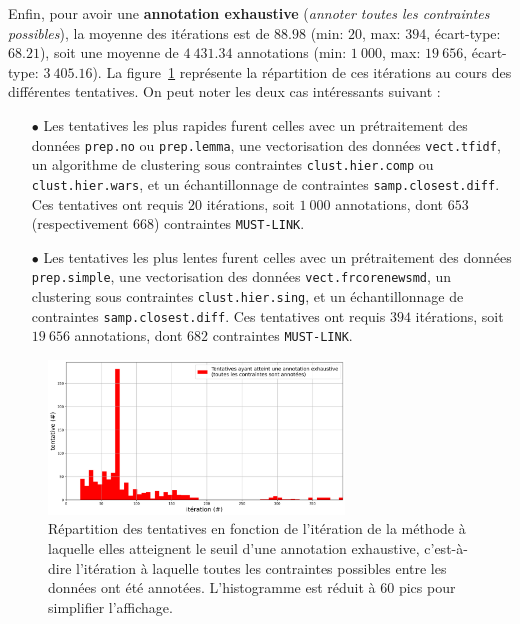 			Enfin, pour avoir une \textbf{annotation exhaustive} (\textit{annoter toutes les contraintes possibles}), la moyenne des itérations est de $88.98$ (min: $20$, max: $394$, écart-type: $68.21$), soit une moyenne de $4~431.34$ annotations (min: $1~000$, max: $19~656$, écart-type: $3~405.16$).
			La figure~\ref{figure:4.2.1-ETUDE-OPTIMISATION-HISTOGRAMME-ANNOTATION-EXHAUSTIVE} représente la répartition de ces itérations au cours des différentes tentatives.
			On peut noter les deux cas intéressants suivant :
			\begin{itemize}
				\item[$\bullet$] Les tentatives les plus rapides furent celles avec un prétraitement des données \texttt{prep.no} ou \texttt{prep.lemma}, une vectorisation des données \texttt{vect.tfidf}, un algorithme de clustering sous contraintes \texttt{clust.hier.comp} ou \texttt{clust.hier.wars}, et un échantillonnage de contraintes \texttt{samp.closest.diff}. Ces tentatives ont requis $20$ itérations, soit $1~000$ annotations, dont $653$ (respectivement $668$) contraintes \texttt{MUST-LINK}.
				\item[$\bullet$] Les tentatives les plus lentes furent celles avec un prétraitement des données \texttt{prep.simple}, une vectorisation des données \texttt{vect.frcorenewsmd}, un clustering sous contraintes \texttt{clust.hier.sing}, et un échantillonnage de contraintes \texttt{samp.closest.diff}. Ces tentatives ont requis $394$ itérations, soit $19~656$ annotations, dont $682$ contraintes \texttt{MUST-LINK}.
			\end{itemize}
			\begin{figure}[!htb]
				\centering
				\includegraphics[width=0.7\textwidth]{figures/etude-efficience-histogramme-annotation-exhaustive}
				\caption{Répartition des tentatives en fonction de l'itération de la méthode à laquelle elles atteignent le seuil d'une annotation exhaustive, c'est-à-dire l'itération à laquelle toutes les contraintes possibles entre les données ont été annotées. L'histogramme est réduit à $60$ pics pour simplifier l'affichage.}
				\label{figure:4.2.1-ETUDE-OPTIMISATION-HISTOGRAMME-ANNOTATION-EXHAUSTIVE}
			\end{figure}
